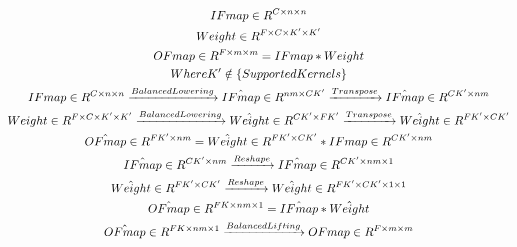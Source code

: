 

\begin{gather}

    IFmap \in R^{C \times n\times n} \\
    Weight \in R^{F \times C\times K'\times K'}  \\
    OFmap \in  R^{F \times m\times m} = IFmap * Weight \\
    Where \space K' \notin \{Supported Kernels\} \\
    IFmap \in R^{C\times n\times n} \xrightarrow[]{Balanced Lowering} \hat{IFmap} \in R^{nm\times CK'} \xrightarrow[]{Transpose} \hat{IFmap} \in R^{CK' \times nm} \\
    Weight \in R^{F\times C\times K' \times K'} \xrightarrow[]{Balanced Lowering} \hat{Weight} \in R^{CK'\times FK'} \xrightarrow[]{Transpose} \hat{Weight} \in R^{FK'\times CK'} \\
    \hat{OFmap} \in R^{FK' \times nm}= \hat{Weight} \in R^{FK'\times CK'} * IFmap \in R^{CK'\times nm}  \\
    \hat{IFmap} \in R^{CK' \times nm} \xrightarrow[]{Reshape} \hat{IFmap} \in R^{CK' \times nm \times 1} \\
    \hat{Weight} \in R^{FK'\times CK'} \xrightarrow[]{Reshape} \hat{Weight} \in R^{FK'\times CK' \times 1 \times1} \\
    \hat{OFmap} \in R^{FK\times nm \times 1} = \hat{IFmap}*\hat{Weight} \\
    \hat{OFmap} \in R^{FK\times nm \times 1} \xrightarrow[]{Balanced Lifting} OFmap \in R^{F \times m \times m} \\
    
\end{gather}